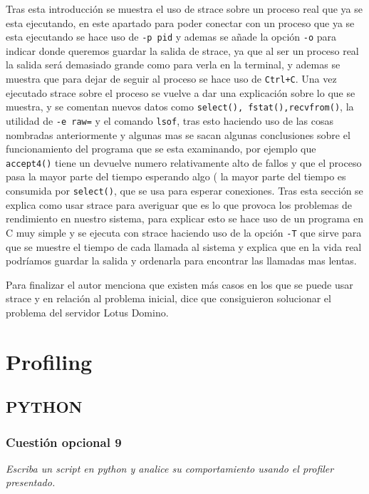Tras esta introducción se muestra el uso de strace sobre un proceso real que ya se esta ejecutando, en este apartado para poder conectar con un proceso que ya se esta ejecutando se hace uso de \texttt{-p pid} y ademas se añade la opción \texttt{-o} para indicar donde queremos guardar la salida de strace, ya que al ser un proceso real la salida será demasiado grande como para verla en la terminal, y ademas se muestra que para dejar de seguir al proceso se hace uso de \texttt{Ctrl+C}. Una vez ejecutado strace sobre el proceso se vuelve a dar una explicación sobre lo que se muestra, y se comentan nuevos datos como \texttt{select(), fstat(),recvfrom()}, la utilidad de \texttt{-e raw=} y el comando \texttt{lsof}, tras esto haciendo uso de las cosas nombradas anteriormente y algunas mas se sacan algunas conclusiones sobre el funcionamiento del programa que se esta examinando, por ejemplo que \texttt{accept4()} tiene un devuelve numero relativamente alto de fallos y que el proceso pasa la mayor parte del tiempo esperando algo ( la mayor parte del tiempo es consumida por \texttt{select()}, que se usa para esperar conexiones. 
Tras esta sección se explica como usar strace para averiguar que es lo que provoca los problemas de rendimiento en nuestro sistema, para explicar esto se hace uso de un programa en C muy simple y se ejecuta con strace haciendo uso de la opción \texttt{-T} que sirve para que se muestre el tiempo de cada llamada al sistema y explica que en la vida real podríamos guardar la salida y ordenarla para encontrar las llamadas mas lentas. 


Para finalizar el autor menciona que existen más casos en los que se puede usar strace y en relación al problema inicial, dice que consiguieron solucionar el problema del servidor Lotus Domino.

\section{Profiling}

\subsection{PYTHON}
\subsubsection{Cuestión opcional 9}
\textit{Escriba un script en python y analice su comportamiento usando el profiler presentado.}
\newline


